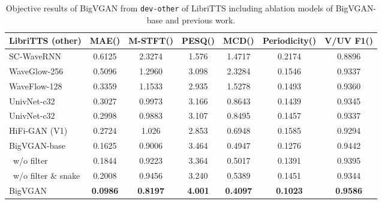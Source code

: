 \documentclass{article} \usepackage{iclr2023_conference,times}
\theoremstyle{plain}
\theoremstyle{definition}
\theoremstyle{remark}
\begin{document}
\begin{table*}[t]
\caption{\footnotesize
Objective results of BigVGAN from \texttt{dev-other} of LibriTTS including ablation models of BigVGAN-base and previous work.
}
\label{libritts-numeric-other}
\vspace{-0.05cm}
\begin{center}
\begin{small}
\begin{adjustbox}{width=0.9\textwidth}
\begin{tabular}{l|cccccc}
\toprule
LibriTTS (other)  & MAE() & M-STFT() & PESQ() & MCD() & Periodicity() & V/UV F1() \\
\midrule
SC-WaveRNN & 0.6125 & 2.3274 & 1.576 & 1.4717 & 0.2174 & 0.8896 \\
WaveGlow-256 & 0.5096 & 1.2960 & 3.098 & 2.3284 & 0.1546 & 0.9337 \\
WaveFlow-128 & 0.3359 & 1.1533 & 2.935 & 1.5278 & 0.1493 & 0.9360 \\
UnivNet-c32 & 0.3027 & 0.9973 & 3.166 & 0.8643 & 0.1439 & 0.9345 \\
UnivNet-c32 & 0.2998 & 0.9883 & 3.107 & 0.8495 & 0.1457 & 0.9337 \\
HiFi-GAN (V1)   & 0.2724 & 1.026 & 2.853 & 0.6948 & 0.1585 & 0.9294\\
\midrule
BigVGAN-base    & 0.1625 & 0.9006 & 3.464 & 0.4947 & 0.1276 & 0.9442 \\
\ w/o filter    & 0.1844 & 0.9223 & 3.364 & 0.5017 & 0.1391 & 0.9395 \\
\ w/o filter \& snake   & 0.2008 & 0.9456 & 3.240 & 0.5389 & 0.1451 & 0.9344 \\
\midrule
BigVGAN    & \textbf{0.0986} & \textbf{0.8197} & \textbf{4.001} & \textbf{0.4097} & \textbf{0.1023} & \textbf{0.9586}\\
\bottomrule
\end{tabular}
\end{adjustbox}
\end{small}
\end{center}
\vskip -0.1in
\end{table*}
\end{document}
